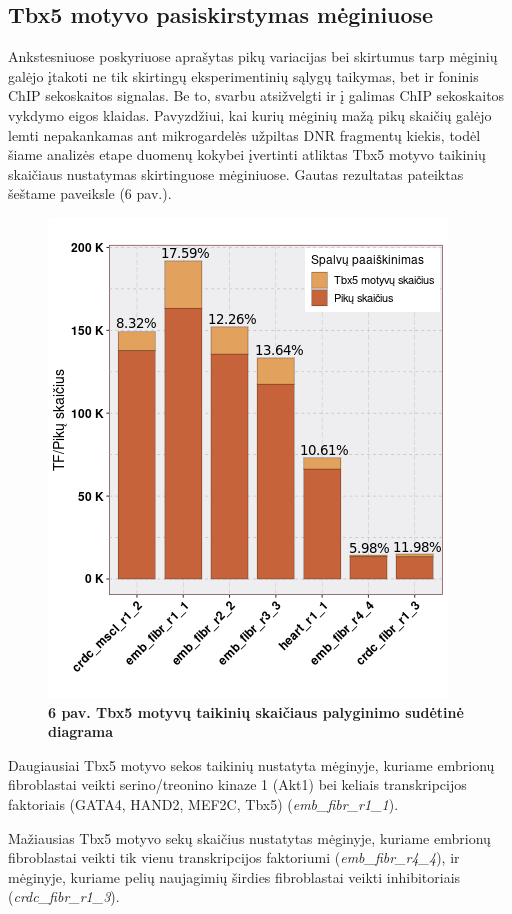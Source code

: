 \documentclass[12pt]{article}
\begin{document}
\newpage


\subsection{Tbx5 motyvo pasiskirstymas mėginiuose}
Ankstesniuose poskyriuose aprašytas pikų variacijas bei skirtumus tarp mėginių
galėjo įtakoti ne tik skirtingų eksperimentinių sąlygų taikymas, bet ir
foninis ChIP sekoskaitos signalas. Be to, svarbu atsižvelgti ir į galimas ChIP
sekoskaitos vykdymo eigos klaidas. Pavyzdžiui, kai kurių mėginių mažą pikų
skaičių galėjo lemti nepakankamas ant mikrogardelės užpiltas DNR fragmentų
kiekis, todėl šiame analizės etape duomenų kokybei įvertinti atliktas Tbx5
motyvo taikinių skaičiaus nustatymas skirtinguose mėginiuose. Gautas rezultatas
pateiktas šeštame paveiksle (6 pav.).

\begin{figure}[htb]
    \begin{center}
        \includegraphics[width=0.5\linewidth]{../Figures/tf_hit_percentage.png}
        \vspace{-2\baselineskip}
        \caption*{\small\textbf{6 pav. Tbx5 motyvų taikinių skaičiaus palyginimo
                                sudėtinė diagrama}}
    \end{center}
\end{figure}

Daugiausiai Tbx5 motyvo sekos taikinių nustatyta mėginyje,
kuriame embrionų fibroblastai veikti serino/treonino kinaze 1 (Akt1) bei
keliais transkripcijos faktoriais (GATA4, HAND2, MEF2C, Tbx5)
(\small\emph{emb\_fibr\_r1\_1}).

Mažiausias Tbx5 motyvo sekų skaičius nustatytas mėginyje, kuriame embrionų
fibroblastai veikti tik vienu transkripcijos faktoriumi
(\small\emph{emb\_fibr\_r4\_4}), ir mėginyje, kuriame pelių naujagimių
širdies fibroblastai veikti inhibitoriais
(\small\emph{crdc\_fibr\_r1\_3}).
\end{document}
